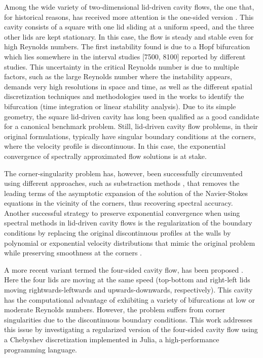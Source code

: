 Among the wide variety of two-dimensional lid-driven cavity flows, the one
that, for historical reasons, has received more attention is the one-sided
version \citep{kuhlmann2019}. This cavity consists of a square with one lid
sliding at a uniform speed, and the three other lids are kept stationary. In
this case, the flow is steady and stable even for high Reynolds numbers. The
first instability found is due to a Hopf bifurcation which lies somewhere in
the interval studies [7500, 8100] \citep{kuhlmann2019} reported by different
studies. This uncertainty in the critical Reynolds number is due to multiple
factors, such as the large Reynolds number where the instability appears,
demands very high resolutions in space and time, as well as the different
spatial discretization techniques and methodologies used in the works to
identify the bifurcation (time integration or linear stability analysis). Due
to its simple geometry, the square lid-driven cavity has long been qualified as
a good candidate for a canonical benchmark problem. Still, lid-driven cavity
flow problems, in their original formulations, typically have singular boundary
conditions at the corners, where the velocity profile is discontinuous. In this
case, the exponential convergence of spectrally approximated flow solutions is
at stake. 

The corner-singularity problem has, however, been successfully circumvented
using different approaches, such as substraction methods \citep{botella1998},
that removes the leading terms of the asymptotic expansion of the solution of
the Navier-Stokes equations in the vicinity of the corners, thus recovering
spectral accuracy. Another successful strategy to preserve exponential
convergence when using spectral methods in lid-driven cavity flows is the
regularization of the boundary conditions by replacing the original
discontinuous profiles at the walls by polynomial or exponential velocity
distributions that mimic the original problem while preserving smoothness at
the corners \citep{shen1991, lopez2017}.

A more recent variant termed the four-sided cavity flow, has been proposed
\citep{wahba2009}. Here the four lids are moving at the same speed (top-bottom
and right-left lids moving rightwards-leftwards and upwards-downwards,
respectively). This cavity has the computational advantage of exhibiting a
variety of bifurcations at low or moderate Reynolds numbers. However, the
problem suffers from corner singularities due to the discontinuous boundary
conditions. This work addresses this issue by investigating a regularized
version of the four-sided cavity flow using a Chebyshev discretization
implemented in Julia, a high-performance programming language.

